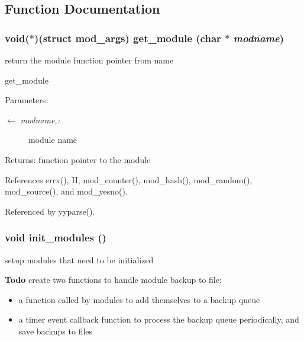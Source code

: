 \subsection{Function Documentation}
\subsubsection[{get\_\-module}]{\setlength{\rightskip}{0pt plus 5cm}void($\ast$)(struct {\bf mod\_\-args}) get\_\-module (char $\ast$ {\em modname})}\label{modules_8c_c9236bf17aa49c868c168ecc5320aded}


return the module function pointer from name 

get\_\-module \begin{Desc}
\item[Parameters:]
\begin{description}
\item[\mbox{$\leftarrow$} {\em modname,:}]module name \end{description}
\end{Desc}
\begin{Desc}
\item[Returns:]function pointer to the module \end{Desc}


References errx(), H, mod\_\-counter(), mod\_\-hash(), mod\_\-random(), mod\_\-source(), and mod\_\-yesno().

Referenced by yyparse().
\subsubsection[{init\_\-modules}]{\setlength{\rightskip}{0pt plus 5cm}void init\_\-modules ()}\label{modules_8c_c5400410e3513d2fbea9b3a2421a2c21}


setup modules that need to be initialized 

\begin{Desc}
\item[{\bf Todo}]create two functions to handle module backup to file:\begin{itemize}
\item a function called by modules to add themselves to a backup queue\item a timer event callback function to process the backup queue periodically, and save backups to files \end{itemize}
\end{Desc}


